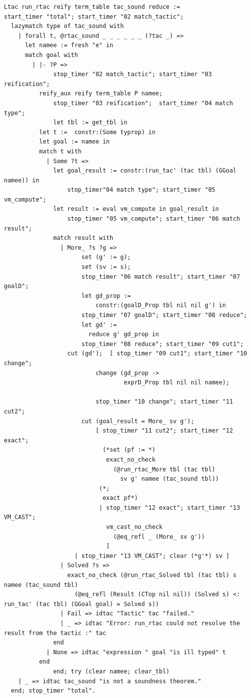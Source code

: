 \documentclass{puthesis}
\begin{document}
\begin{lstlisting}
Ltac run_rtac reify term_table tac_sound reduce :=
start_timer "total"; start_timer "02 match_tactic";
  lazymatch type of tac_sound with
    | forall t, @rtac_sound _ _ _ _ _ _ (?tac _) =>
	  let namee := fresh "e" in
	  match goal with
	    | |- ?P => 
              stop_timer "02 match_tactic"; start_timer "03 reification";
	      reify_aux reify term_table P namee;
              stop_timer "03 reification";  start_timer "04 match type";
              let tbl := get_tbl in
	      let t :=  constr:(Some typrop) in
	      let goal := namee in
	      match t with
	        | Some ?t =>
	          let goal_result := constr:(run_tac' (tac tbl) (GGoal namee)) in
                  stop_timer"04 match type"; start_timer "05 vm_compute";
	          let result := eval vm_compute in goal_result in
                  stop_timer "05 vm_compute"; start_timer "06 match result";
	          match result with
	            | More_ ?s ?g =>
                      set (g' := g);
                      set (sv := s);
                      stop_timer "06 match result"; start_timer "07 goalD";
                      let gd_prop := 
                          constr:(goalD_Prop tbl nil nil g') in
                      stop_timer "07 goalD"; start_timer "08 reduce";
                      let gd' := 
                        reduce g' gd_prop in
                      stop_timer "08 reduce"; start_timer "09 cut1";
	              cut (gd');  [ stop_timer "09 cut1"; start_timer "10 change";
                          change (gd_prop -> 
                                  exprD_Prop tbl nil nil namee);

                          stop_timer "10 change"; start_timer "11 cut2";
	                  cut (goal_result = More_ sv g');
                          [ stop_timer "11 cut2"; start_timer "12 exact"; 
                            (*set (pf := *)
                             exact_no_check
                               (@run_rtac_More tbl (tac tbl) 
                                 sv g' namee (tac_sound tbl))
                           (*;
                            exact pf*)
                           | stop_timer "12 exact"; start_timer "13 VM_CAST"; 
                             vm_cast_no_check 
                               (@eq_refl _ (More_ sv g'))
                             ] 
	                | stop_timer "13 VM_CAST"; clear (*g'*) sv ]
	            | Solved ?s =>
	              exact_no_check (@run_rtac_Solved tbl (tac tbl) s namee (tac_sound tbl) 
	                (@eq_refl (Result (CTop nil nil)) (Solved s) <: run_tac' (tac tbl) (GGoal goal) = Solved s))
	            | Fail => idtac "Tactic" tac "failed."
	            | _ => idtac "Error: run_rtac could not resolve the result from the tactic :" tac
	          end
	        | None => idtac "expression " goal "is ill typed" t
	      end
              end; try (clear namee; clear_tbl)
	| _ => idtac tac_sound "is not a soundness theorem."
  end; stop_timer "total".
\end{lstlisting}
\end{document}

